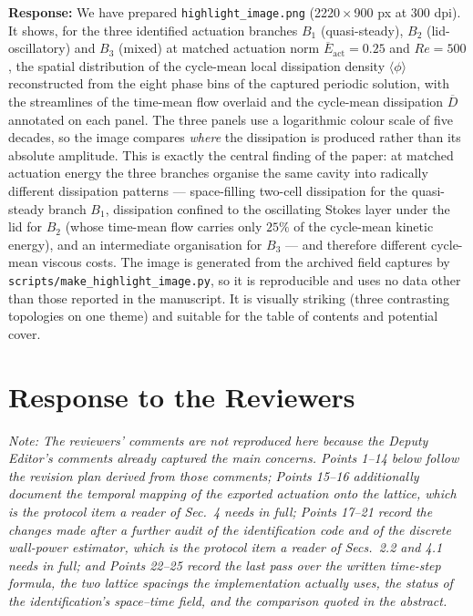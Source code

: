 \documentclass[11pt,a4paper]{article}
\newcommand{\brk}{\hspace{0pt}}
\begin{document}
\noindent\textbf{Response:} We have prepared \texttt{highlight\_image.png}
(2220\,$\times$\,900 px at 300 dpi). It shows, for the three identified
actuation branches $B_1$ (quasi-steady), $B_2$ (lid-oscillatory) and $B_3$
(mixed) at matched actuation norm $\overline{E}_{\mathrm{act}} = 0.25$ and
$Re = 500$, the spatial distribution of the cycle-mean local dissipation
density $\langle\phi\rangle$ reconstructed from the eight phase bins of the
captured periodic solution, with the streamlines of the time-mean flow
overlaid and the cycle-mean dissipation $\overline{D}$ annotated on each
panel. The three panels use a logarithmic colour scale of five decades, so
the image compares \emph{where} the dissipation is produced rather than its
absolute amplitude. This is exactly the central finding of the paper: at
matched actuation energy the three branches organise the same cavity into
radically different dissipation patterns --- space-filling two-cell
dissipation for the quasi-steady branch $B_1$, dissipation confined to the
oscillating Stokes layer under the lid for $B_2$ (whose time-mean flow
carries only $25\%$ of the cycle-mean kinetic energy), and an intermediate
organisation for $B_3$ --- and therefore different cycle-mean viscous costs. The image is generated from
the archived field captures by \texttt{scripts/make\_highlight\_image\brk.py},
so it is reproducible and uses no data other than those reported in the
manuscript. It is visually striking (three contrasting topologies on one
theme) and suitable for the table of contents and potential cover.

\newpage

\section*{Response to the Reviewers}

\noindent\textit{Note: The reviewers' comments are not reproduced here because
the Deputy Editor's comments already captured the main concerns. Points 1--14
below follow the revision plan derived from those comments; Points 15--16
additionally document the temporal mapping of the exported actuation onto the
lattice, which is the protocol item a reader of Sec.~4 needs in full; Points
17--21 record the changes made after a further audit of the identification code
and of the discrete wall-power estimator, which is the protocol item a reader of
Secs.~2.2 and 4.1 needs in full; and Points 22--25 record the last pass over the
written time-step formula, the two lattice spacings the implementation actually
uses, the status of the identification's space--time field, and the comparison
quoted in the abstract.}
\end{document}
